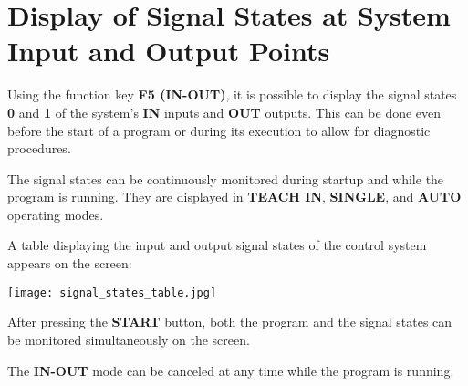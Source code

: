\newpage

\section{Display of Signal States at System Input and Output Points}

Using the function key \textbf{F5 (IN-OUT)}, it is possible to display the signal states \textbf{0} and \textbf{1} of the system's \textbf{IN} inputs and \textbf{OUT} outputs. This can be done even before the start of a program or during its execution to allow for diagnostic procedures.

The signal states can be continuously monitored during startup and while the program is running. They are displayed in \textbf{TEACH IN}, \textbf{SINGLE}, and \textbf{AUTO} operating modes.

\procedure

\begin{itemize}
\end{itemize}

\vspace{.5cm}

\begin{itemize}
\end{itemize}

\vspace{.5cm}

\begin{itemize}
\end{itemize}

A table displaying the input and output signal states of the control system appears on the screen:

\begin{center}
    \texttt{[image: signal\_states\_table.jpg]}
\end{center}

After pressing the \textbf{START} button, both the program and the signal states can be monitored simultaneously on the screen.

The \textbf{IN-OUT} mode can be canceled at any time while the program is running.

\begin{itemize}
\end{itemize}

